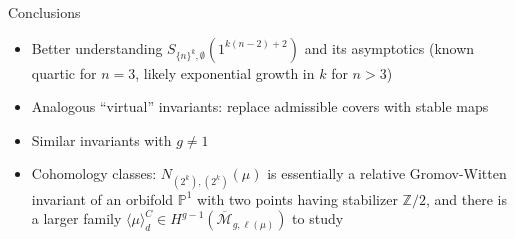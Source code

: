 \documentclass{beamer}
\newcommand{\Z}{\ensuremath{\mathbb{Z}}}
\renewcommand{\P}{\mathbb P}
\theoremstyle{definition}
\begin{document}
\begin{frame}{Conclusions}
\begin{itemize}
\begin{itemize}
                                                                                                                                                                                                                              \item Better understanding $S_{\{n\}^k,\emptyset}(1^{k(n-2)+2})$ and its asymptotics (known quartic for $n=3$, likely
                                                                                                                                                                                                                                exponential growth in $k$ for $n>3$)
                                                                                                                                                                                                                                \item Analogous ``virtual'' invariants: replace admissible covers with stable maps
                                                                                                                                                                                                                              \item Similar invariants with $g\neq 1$
                                                                                                                                                                                                                              \item Cohomology classes: $N_{(2^k),(2^k)}(\mu)$ is essentially a relative Gromov-Witten invariant of an orbifold $\P^1$ with
                                                                                                                                                                                                                                two points having stabilizer $\Z/2$,
                                                                                                                                                                                                                                and there is a larger family $\langle \mu\rangle_d^{C}\in H^{g-1}(\overline{\mathcal M}_{g,\ell(\mu)})$ to study
                                                                                                                                                                                                                              \end{itemize}
                                                                                                                                                                                                                            \end{itemize}
                                                                                                                                                                                                                          \end{frame}
\end{document}
